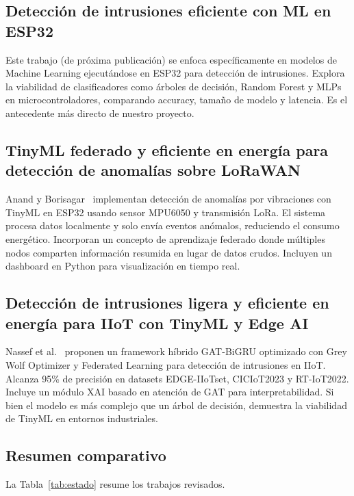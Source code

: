 \documentclass[12pt,a4paper]{article}
\begin{document}
\subsection{Detección de intrusiones eficiente con ML en ESP32}
\label{sec:paper2}

Este trabajo (de próxima publicación) se enfoca específicamente en modelos de Machine Learning ejecutándose en ESP32 para detección de intrusiones. Explora la viabilidad de clasificadores como árboles de decisión, Random Forest y MLPs en microcontroladores, comparando accuracy, tamaño de modelo y latencia. Es el antecedente más directo de nuestro proyecto.

\subsection{TinyML federado y eficiente en energía para detección de anomalías sobre LoRaWAN}
\label{sec:paper3}

Anand y Borisagar~\cite{anand2026energy} implementan detección de anomalías por vibraciones con TinyML en ESP32 usando sensor MPU6050 y transmisión LoRa. El sistema procesa datos localmente y solo envía eventos anómalos, reduciendo el consumo energético. Incorporan un concepto de aprendizaje federado donde múltiples nodos comparten información resumida en lugar de datos crudos. Incluyen un dashboard en Python para visualización en tiempo real.

\subsection{Detección de intrusiones ligera y eficiente en energía para IIoT con TinyML y Edge AI}
\label{sec:paper4}

Nassef et al.~\cite{nassef2026lightweight} proponen un framework híbrido GAT-BiGRU optimizado con Grey Wolf Optimizer y Federated Learning para detección de intrusiones en IIoT. Alcanza 95\% de precisión en datasets EDGE-IIoTset, CICIoT2023 y RT-IoT2022. Incluye un módulo XAI basado en atención de GAT para interpretabilidad. Si bien el modelo es más complejo que un árbol de decisión, demuestra la viabilidad de TinyML en entornos industriales.

\subsection{Resumen comparativo}
\label{sec:resumen}

La Tabla~\ref{tab:estado} resume los trabajos revisados.
\end{document}
